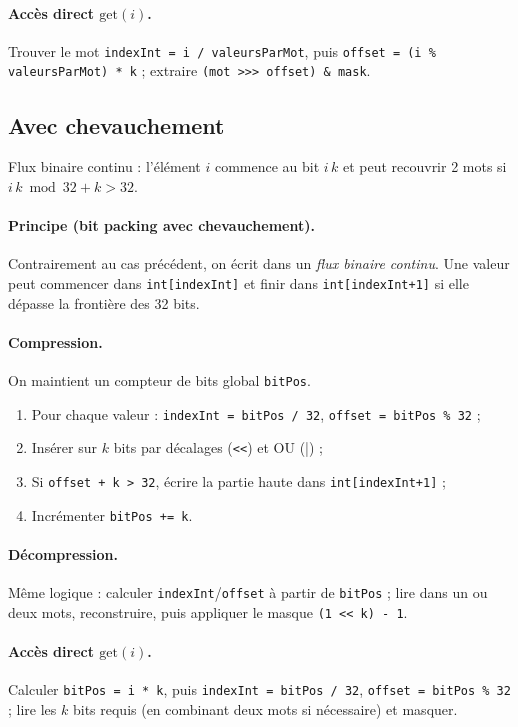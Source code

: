 \paragraph{Accès direct $\mathrm{get}(i)$.}
Trouver le mot \verb|indexInt = i / valeursParMot|, puis \verb|offset = (i % valeursParMot) * k| ; extraire \verb|(mot >>> offset) & mask|.

\subsection{Avec chevauchement}
Flux binaire continu : l'élément $i$ commence au bit $i\,k$ et peut recouvrir 2 mots si $i\,k \bmod 32 + k > 32$.

\paragraph{Principe (bit packing avec chevauchement).}
Contrairement au cas précédent, on écrit dans un \emph{flux binaire continu}. Une valeur peut commencer dans \verb|int[indexInt]| et finir dans \verb|int[indexInt+1]| si elle dépasse la frontière des 32 bits.

\paragraph{Compression.}
On maintient un compteur de bits global \verb|bitPos|.
\begin{enumerate}
  \item Pour chaque valeur : \verb|indexInt = bitPos / 32|, \verb|offset = bitPos % 32| ;
  \item Insérer sur $k$ bits par décalages (\verb|<<|) et OU (\verb|||) ;
  \item Si \verb|offset + k > 32|, écrire la partie haute dans \verb|int[indexInt+1]| ;
  \item Incrémenter \verb|bitPos += k|.
\end{enumerate}

\paragraph{Décompression.}
Même logique : calculer \verb|indexInt|/\verb|offset| à partir de \verb|bitPos| ; lire dans un ou deux mots, reconstruire, puis appliquer le masque \verb|(1 << k) - 1|.

\paragraph{Accès direct $\mathrm{get}(i)$.}
Calculer \verb|bitPos = i * k|, puis \verb|indexInt = bitPos / 32|, \verb|offset = bitPos % 32| ; lire les $k$ bits requis (en combinant deux mots si nécessaire) et masquer.

